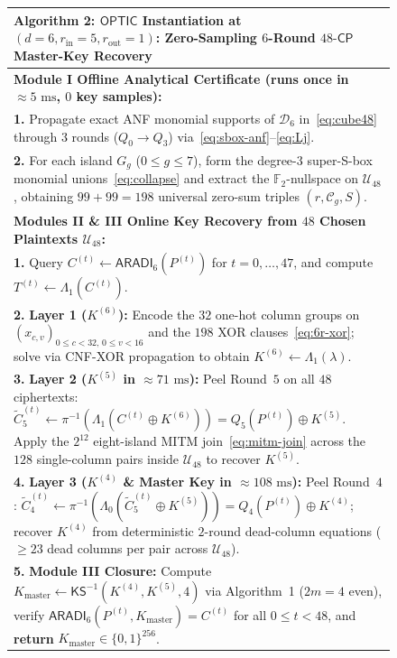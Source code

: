 \documentclass[11pt,a4paper]{article}
\theoremstyle{definition}
\theoremstyle{remark}
\newcommand{\Ftwo}{\mathbb{F}_2}
\newcommand{\OPTIC}{\mathsf{OPTIC}}
\newcommand{\CP}{\mathsf{CP}}
\begin{document}
\begin{figure}[t]
\centering
\small
\begin{tabular}{@{}p{}@{}}
\toprule
\textbf{Algorithm 2:} $\OPTIC$ Instantiation at $(d{=}6, r_{\text{in}}{=}5, r_{\text{out}}{=}1)$: Zero-Sampling $6$-Round $48\text{-}\CP$ Master-Key Recovery \\
\midrule
\textbf{Module I Offline Analytical Certificate (runs once in $\approx 5\text{ ms}$, $0$ key samples):} \\
\hspace*{1.2em} \textbf{1.} Propagate exact ANF monomial supports of $\mathcal{D}_6$ in~\eqref{eq:cube48} through $3$ rounds ($Q_0 \to Q_3$) via~\eqref{eq:sbox-anf}--\eqref{eq:Lj}. \\
\hspace*{1.2em} \textbf{2.} For each island $G_g$ ($0 \le g \le 7$), form the degree-$3$ super-S-box monomial unions~\eqref{eq:collapse} and extract the $\Ftwo$-nullspace on $\mathcal{U}_{48}$, obtaining $99 + 99 = 198$ universal zero-sum triples $(r, \mathcal{C}_g, S)$. \\[3pt]
\midrule
\textbf{Modules II \& III Online Key Recovery from $48$ Chosen Plaintexts $\mathcal{U}_{48}$:} \\
\hspace*{1.2em} \textbf{1.} Query $C^{(t)} \leftarrow \mathsf{ARADI}_6(P^{(t)})$ for $t = 0, \dots, 47$, and compute $T^{(t)} \leftarrow \Lambda_1(C^{(t)})$. \\
\hspace*{1.2em} \textbf{2.} \textbf{Layer 1 ($K^{(6)}$):} Encode the $32$ one-hot column groups on $(x_{c,v})_{0 \le c < 32,\, 0 \le v < 16}$ and the $198$ XOR clauses~\eqref{eq:6r-xor}; solve via CNF-XOR propagation to obtain $K^{(6)} \leftarrow \Lambda_1(\lambda)$. \\
\hspace*{1.2em} \textbf{3.} \textbf{Layer 2 ($K^{(5)}$ in $\approx 71\text{ ms}$):} Peel Round~$5$ on all $48$ ciphertexts: $\tilde{C}_5^{(t)} \leftarrow \pi^{-1}(\Lambda_1(C^{(t)} \oplus K^{(6)})) = Q_5(P^{(t)}) \oplus K^{(5)}$. Apply the $2^{12}$ eight-island MITM join~\eqref{eq:mitm-join} across the $128$ single-column pairs inside $\mathcal{U}_{48}$ to recover $K^{(5)}$. \\
\hspace*{1.2em} \textbf{4.} \textbf{Layer 3 ($K^{(4)}$ \& Master Key in $\approx 108\text{ ms}$):} Peel Round~$4$: $\tilde{C}_4^{(t)} \leftarrow \pi^{-1}(\Lambda_0(\tilde{C}_5^{(t)} \oplus K^{(5)})) = Q_4(P^{(t)}) \oplus K^{(4)}$; recover $K^{(4)}$ from deterministic $2$-round dead-column equations ($\ge 23$ dead columns per pair across $\mathcal{U}_{48}$). \\
\hspace*{1.2em} \textbf{5.} \textbf{Module III Closure:} Compute $K_{\text{master}} \leftarrow \mathsf{KS}^{-1}(K^{(4)}, K^{(5)}, 4)$ via Algorithm~1 ($2m = 4$ even), verify $\mathsf{ARADI}_6(P^{(t)}, K_{\text{master}}) = C^{(t)}$ for all $0 \le t < 48$, and \textbf{return} $K_{\text{master}} \in \{0,1\}^{256}$. \\
\bottomrule
\end{tabular}
\end{figure}
\end{document}
